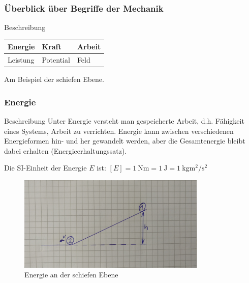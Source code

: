 \documentclass[12pt,oneside]{scrartcl}
\begin{document}
\frame
{
  \frametitle{Überblick über Begriffe der Mechanik}
\begin{block}{Beschreibung}
\vspace{0.5cm}
\begin{tabular}{|>{\centering\arraybackslash}p{3cm}|>{\centering\arraybackslash}p{3cm}|>{\centering\arraybackslash}p{3cm}|}
\hline
\rule[-1ex]{0pt}{2.5ex} Energie & Kraft & Arbeit \\
\hline 
\rule[-1ex]{0pt}{2.5ex} Leistung & Potential & Feld \\ 
\hline 
\end{tabular}
\vspace{0.5cm}
\end{block}
Am Beispiel der schiefen Ebene.
}

\frame
{
  \frametitle{Energie}
\begin{block}{Beschreibung}
Unter Energie versteht man gespeicherte Arbeit, d.h. Fähigkeit eines Systems, Arbeit zu verrichten. Energie kann zwischen verschiedenen Energieformen hin- und her gewandelt werden, aber die Gesamtenergie bleibt dabei erhalten (Energieerhaltungssatz).
\end{block}
Die SI-Einheit der Energie $E$ ist:
$[E]=\SI{1}{\newton\meter}=\SI{1}{\joule}=\SI{1}{\kilo\gram\square\meter\per\square\second}$
      \begin{figure}
	  \includegraphics[width=0.8\textwidth]{Energie_1}
	  \vspace{-3mm}
	  \caption{Energie an der schiefen Ebene}
   \end{figure}
}
\end{document}
